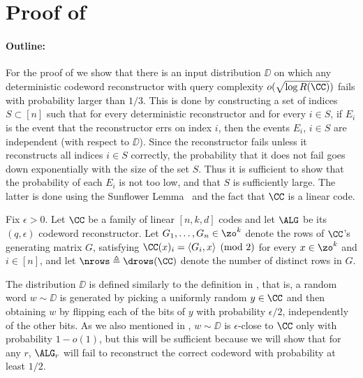 \section{Proof of }

\paragraph{Outline:} For the proof of  we show that there is an input distribution $\DD$ on which any deterministic codeword reconstructor with query complexity $o(\sqrt{\log R(\CC)})$ fails with probability larger than $1/3$. This is done by constructing a set of indices $S\subset [n]$ such that for every deterministic reconstructor and for every $i\in S$, if $E_i$ is the event that the reconstructor errs on index $i$, then the events $E_i$, $i\in S$ are independent (with respect to $\DD$). Since the reconstructor fails unless it reconstructs all indices $i \in S$ correctly, the probability that it does not fail goes down exponentially with the size of the set $S$. Thus it is sufficient to show that the probability of each $E_i$ is not too low, and that $S$ is sufficiently large. The latter is done using the Sunflower Lemma~\cite{sunflower} and the fact that $\CC$ is a linear code.

Fix $\epsilon > 0$. Let $\CC$ be a family of linear $[n,k,d]$ codes and let $\ALG$ be its $(q,\epsilon)$ codeword reconstructor.
Let $G_1, \ldots, G_n \in \zo^k$ denote the rows of $\CC$'s generating matrix $G$, satisfying $\CC(x)_i = \langle G_i,x\rangle  \pmod{2}$ for every $x \in \zo^k$ and $i\in [n]$, and let $\nrows \triangleq \drows(\CC)$ denote the number of distinct rows in $G$.

The distribution $\DD$ is defined similarly to the definition in , that is, a random word $w\sim\DD$ is generated by picking a uniformly random $y \in \CC$ and then obtaining $w$ by flipping each of the bits of $y$ with probability $\epsilon/2$, independently of the other bits. As we also mentioned in , $w\sim \DD$ is $\epsilon$-close to $\CC$ only with probability $1-o(1)$, but this will be sufficient because we will show that for any $r$,  $\ALG_r$ will fail to reconstruct the correct codeword with probability at least $1/2$.


